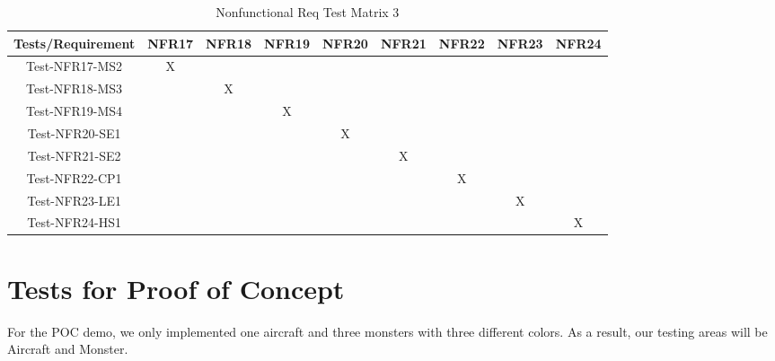 \documentclass[12pt]{article}
\begin{document}
\begin{table}[htp]
\centering
\caption{Nonfunctional Req Test Matrix 3}
\begin{tabular}{|c|c|c|c|c|c|c|c|c|}
\hline
Tests/Requirement & NFR17 & NFR18 & NFR19 & NFR20 & NFR21 & NFR22 & NFR23 & NFR24 \\  \hline
Test-NFR17-MS2    & X     &       &       &       &       &       &       &       \\  \hline
Test-NFR18-MS3    &       & X     &       &       &       &       &       &       \\  \hline
Test-NFR19-MS4    &       &       & X     &       &       &       &       &       \\  \hline
Test-NFR20-SE1    &       &       &       & X     &       &       &       &       \\  \hline
Test-NFR21-SE2    &       &       &       &       & X     &       &       &       \\  \hline
Test-NFR22-CP1    &       &       &       &       &       & X     &       &       \\  \hline
Test-NFR23-LE1    &       &       &       &       &       &       & X     &       \\ \hline
Test-NFR24-HS1    &       &       &       &       &       &       &       & X    \\ \hline
\end{tabular}
\end{table}
\newpage
\section{Tests for Proof of Concept}
For the POC demo, we only implemented one aircraft and 
three monsters with three different colors. As a result,
our testing areas will be Aircraft and Monster.
\end{document}
